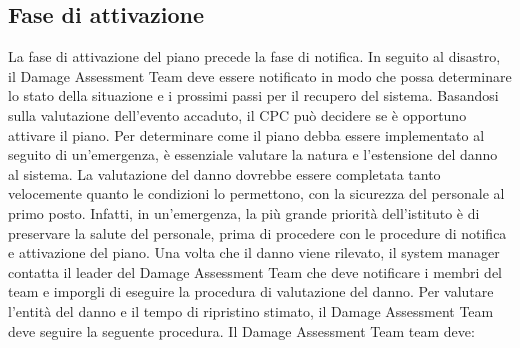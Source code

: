 \documentclass[12pt, a4paper, titlepage]{report}
\begin{document}
	\subsection{Fase di attivazione} \label{attivazione}
	
	La fase di attivazione del piano precede la fase di notifica. In seguito al disastro, il Damage Assessment Team deve essere notificato in modo che possa determinare lo stato della situazione e i prossimi passi per il recupero del sistema. Basandosi sulla valutazione dell'evento accaduto, il CPC può decidere se è opportuno attivare il piano. Per determinare come il piano debba essere implementato al seguito di un'emergenza, è essenziale valutare la natura e l'estensione del danno al sistema. La valutazione del danno dovrebbe essere completata tanto velocemente quanto le condizioni lo permettono, con la sicurezza del personale al primo posto. Infatti, in un'emergenza, la più grande priorità dell'istituto è di preservare la salute del personale, prima di procedere con le procedure di notifica e attivazione del piano. Una volta che il danno viene rilevato, il system manager contatta il leader del Damage Assessment Team che deve notificare i membri del team e imporgli di eseguire la procedura di valutazione del danno. Per valutare l'entità del danno e il tempo di ripristino stimato, il Damage Assessment Team deve seguire la seguente procedura.
	Il Damage Assessment Team team deve:
\end{document}
